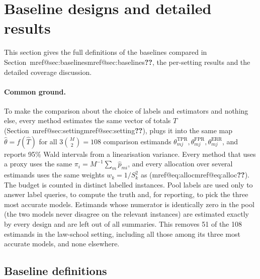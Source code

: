 \documentclass[pdflatex,sn-mathphys-num,iicol]{sn-jnl}
\makeatletter
\theoremstyle{thmstyleone}
\theoremstyle{thmstyletwo}
\theoremstyle{thmstylethree}
\newcommand{\Mref}[1]{\ifcsname mref@#1\endcsname\csname mref@#1\endcsname\else\textbf{??}\fi}
\makeatother
\begin{document}
\section{Baseline designs and detailed results}\label{si:baselines}

This section gives the full definitions of the baselines compared in Section~\Mref{sec:baselines}, the per-setting results and the detailed coverage discussion.

\paragraph{Common ground.} To make the comparison about the choice of labels and estimators and nothing else, every method estimates the same vector of totals $T$ (Section~\Mref{sec:setting}), plugs it into the same map $\hat\theta=f(\hat T)$ for all $3\binom{M}{2}=108$ comparison estimands $\theta^{\mathrm{TPR}}_{mj},\theta^{\mathrm{FPR}}_{mj},\theta^{\mathrm{ERR}}_{mj}$, and reports 95\% Wald intervals from a linearisation variance. Every method that uses a proxy uses the same $\pi_i=M^{-1}\sum_m\hat p_{mi}$, and every allocation over several estimands uses the same weights $w_k=1/S_k^2$ as (\Mref{eq:alloc}). The budget is counted in distinct labelled instances. Pool labels are used only to answer label queries, to compute the truth and, for reporting, to pick the three most accurate models. Estimands whose numerator is identically zero in the pool (the two models never disagree on the relevant instances) are estimated exactly by every design and are left out of all summaries. This removes 51 of the 108 estimands in the law-school setting, including all those among its three most accurate models, and none elsewhere.

\subsection{Baseline definitions}
\end{document}
